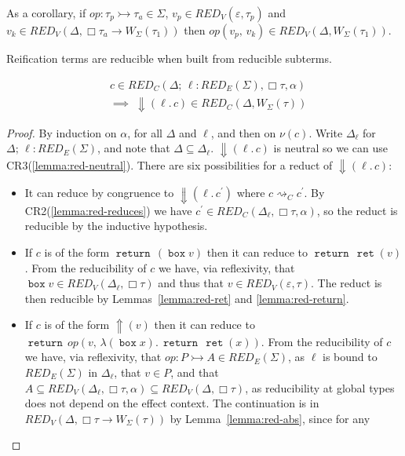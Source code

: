 \documentclass[acmsmall, screen, review, anonymous]{acmart}
\theoremstyle{definition}
\newcommand{\glob}{\mathop{\Box}}
\newcommand{\arr}{\rightarrow}
\newcommand{\reflectname}{\mathord{\Uparrow}}
\newcommand{\performraw}[2]{\mathop{\reflectname(#1(#2))}}
\newcommand{\perform}[3]{\performraw{#1}{#2}(#3)}
\newcommand{\reifyname}{\Downarrow}
\newcommand{\reify}[2]{\mathop{\reifyname}(#1.\,#2)}
\newcommand{\loc}{\ell}
\newcommand{\ind}[1]{W_{#1}}
\newcommand{\indintro}[3]{{#1}(#2,\, #3)}
\newcommand{\retname}{\mathtt{ret}}
\newcommand{\ret}[1]{\mathop{\retname}(#1)}
\newcommand{\types}{\mathrel{:}}
\newcommand{\abs}[2]{\lambda#1.\,#2}
\newcommand{\cempty}{\varepsilon}
\newcommand{\ccons}[2]{#1;\,#2}
\newcommand{\lbind}[3]{\ccons{#1}{#2\types#3}}
\newcommand{\returnname}{\mathop{\mathtt{return}}}
\newcommand{\return}[1]{\returnname\, #1}
\newcommand{\gboxname}{\mathop{\mathtt{box}}}
\newcommand{\gbox}[1]{\gboxname #1}
\newcommand{\stepstoname}{\rightsquigarrow}
\newcommand{\stepstoc}{\stepstoname_C}
\newcommand{\bound}[1]{\nu(#1)}
\newcommand{\redname}{RED}
\newcommand{\redvname}{\redname_{V}}
\newcommand{\redv}[2]{\redvname{({#1},{#2})}}
\newcommand{\redva}[3]{\redvname{({#1},{#2},{#3})}}
\newcommand{\redcname}{\redname_{C}}
\newcommand{\redc}[2]{\redcname{({#1},{#2})}}
\newcommand{\redca}[3]{\redcname{({#1},{#2},{#3})}}
\newcommand{\redsigname}{\redname_{E}}
\newcommand{\redsig}[1]{\redsigname{(#1)}}
\begin{document}
As a corollary, if $op \types \tau_p \rightarrowtail \tau_a \in \Sigma$,
$v_p \in \redv{\cempty}{\tau_p}$ and
$v_k \in \redv{\Delta}{\glob \tau_a \arr \ind{\Sigma}(\tau_1)}$ then
$\indintro{op}{v_p}{v_k} \in \redv{\Delta}{\ind{\Sigma}(\tau_1)}$.

Reification terms are reducible when built from reducible subterms.
\begin{lemma}
\label{lemma:red-reify}
\begin{align*}
  &c \in \redca{\lbind{\Delta}{\loc}{\redsig{\Sigma}}}{\glob \tau}{\alpha} \\
  &\implies \; \reify{\loc}{c} \in \redc{\Delta}{\ind{\Sigma}(\tau)}
\end{align*}
\end{lemma}
\begin{proof}
  By induction on $\alpha$, for all $\Delta$ and $\loc$, and then on
  $\bound{c}$. Write $\Delta_{\loc}$ for
  $\lbind{\Delta}{\loc}{\redsig{\Sigma}}$, and note that
  $\Delta \subseteq \Delta_{\loc}$. $\reify{\loc}{c}$ is neutral so we
  can use CR3(\ref{lemma:red-neutral}). There are six possibilities
  for a reduct of $\reify{\loc}{c}$:
  \begin{itemize}
  \item It can reduce by congruence to $\reify{\loc}{c^{\prime}}$ where
    $c \stepstoc c^{\prime}$. By CR2(\ref{lemma:red-reduces}) we have
    $c^{\prime} \in \redca{\Delta_{\loc}}{\glob \tau}{\alpha}$, so the
    reduct is reducible by the inductive hypothesis.
  \item If $c$ is of the form $\return{(\gbox{v})}$ then it can reduce
    to $\return{\ret{v}}$. From the reducibility of $c$ we have, via
    reflexivity, that
    $\gbox{v} \in \redv{\Delta_{\loc}}{\glob \tau}$ and
    thus that $v \in \redv{\cempty}{\tau}$. The reduct is then reducible
    by Lemmas~\ref{lemma:red-ret} and \ref{lemma:red-return}.
  \item If $c$ is of the form $\perform{\loc}{op}{v}$ then it can reduce
    to
    $\return{\indintro{op}{v}{\abs{(\gbox{x})}{\return{\ret{x}}}}}$.
    From the reducibility of $c$ we have, via reflexivity, that
    $op \types P \rightarrowtail A \in \redsig{\Sigma}$, as $\loc$ is
    bound to $\redsig{\Sigma}$ in $\Delta_{\loc}$, that $v \in P$, and
    that $A \subseteq \redva{\Delta_{\loc}}{\glob \tau}{\alpha}
    \subseteq \redv{\Delta}{\glob \tau}$, as reducibility at global
    types does not depend on the effect context. The continuation is in
    $\redv{\Delta}{\glob \tau \arr \ind{\Sigma}(\tau)}$ by
    Lemma~\ref{lemma:red-abs}, since for any

\end{itemize}
\end{proof}
\end{document}

